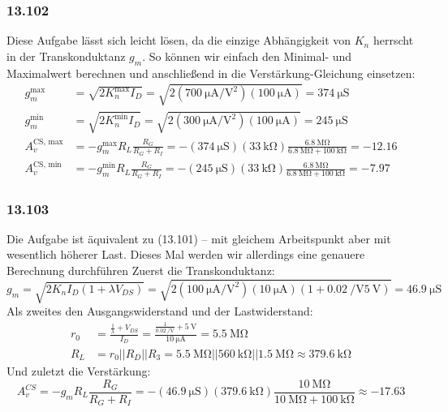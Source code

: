 \documentclass[11pt,a4paper,titlepage]{article}
\begin{document}
\subsubsection*{13.102}
Diese Aufgabe lässt sich leicht lösen, da die einzige Abhängigkeit von $K_n$ herrscht in der Transkonduktanz $g_m$. So können wir einfach den Minimal- und Maximalwert berechnen und anschließend in die Verstärkung-Gleichung einsetzen:
\begin{equation}
\begin{aligned}
g_m^{\text{max}} &= \sqrt{2K_n^{\text{max}}I_D} = \sqrt{2(\SI{700}{\micro\ampere\per\square\volt})(\SI{100}{\micro\ampere})} = \SI{374}{\micro\siemens} \\
g_m^{\text{min}} &= \sqrt{2K_n^{\text{min}}I_D} = \sqrt{2(\SI{300}{\micro\ampere\per\square\volt})(\SI{100}{\micro\ampere})} = \SI{245}{\micro\siemens} \\
A_v^{\text{CS, max}} &= -g_m^{\text{max}}R_L\frac{R_G}{R_G+R_I} = -(\SI{374}{\micro\siemens})(\SI{33}{\kilo\ohm})\frac{\SI{6.8}{\mega\ohm}}{\SI{6.8}{\mega\ohm}+\SI{100}{\kilo\ohm}} = -12.16\\
A_v^{\text{CS, min}} &= -g_m^{\text{min}}R_L\frac{R_G}{R_G+R_I} = -(\SI{245}{\micro\siemens})(\SI{33}{\kilo\ohm})\frac{\SI{6.8}{\mega\ohm}}{\SI{6.8}{\mega\ohm}+\SI{100}{\kilo\ohm}} = -7.97
\end{aligned}
\end{equation}

\subsubsection*{13.103}
Die Aufgabe ist äquivalent zu (13.101) – mit gleichem Arbeitspunkt aber mit wesentlich höherer Last. Dieses Mal werden wir allerdings eine genauere Berechnung durchführen Zuerst die Transkonduktanz:
\[ g_m = \sqrt{2K_nI_D(1+\lambda V_{DS})} = \sqrt{2(\SI{100}{\micro\ampere\per\square\volt})(\SI{10}{\micro\ampere})(1+\SI{0.02}{\per\volt}\SI{5}{\volt})} = \SI{46.9}{\micro\siemens} \] 
Als zweites den Ausgangswiderstand und der Lastwiderstand:
\begin{equation} 
\begin{aligned}
r_0 &= \frac{\frac{1}{\lambda}+V_{DS}}{I_D} = \frac{\frac{1}{\SI{0.02}{\per\volt}}+\SI{5}{\volt}}{\SI{10}{\micro\ampere}} = \SI{5.5}{\mega\ohm}\\
R_L &= r_0||R_D||R_3 = \SI{5.5}{\mega\ohm} || \SI{560}{\kilo\ohm} || \SI{1.5}{\mega\ohm} \approx \SI{379.6}{\kilo\ohm}
\end{aligned}
\end{equation}
Und zuletzt die Verstärkung:
\[ A_v^{CS} = -g_mR_L\frac{R_G}{R_G+R_I} = -(\SI{46.9}{\micro\siemens})(\SI{379.6}{\kilo\ohm}) \frac{\SI{10}{\mega\ohm}}{\SI{10}{\mega\ohm} + \SI{100}{\kilo\ohm}} \approx - 17.63 \]
\end{document}

